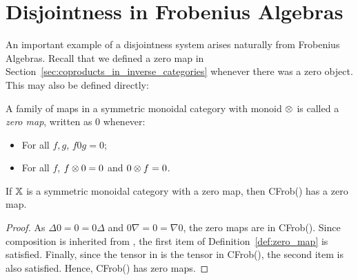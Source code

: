 \section{Disjointness in Frobenius Algebras}
\label{sec:disjointness_in_frobenius_algebras}
An important example of a disjointness system arises naturally from Frobenius Algebras. Recall that
we defined a zero map in Section~\ref{sec:coproducts_in_inverse_categories} whenever there was a
zero object. This may also be defined directly:

\begin{definition}\label{def:zero_map}
  A family of maps in a symmetric monoidal category with monoid $\otimes$ is called a \emph{zero map},
  written as $0$ whenever:
  \begin{itemize}
    \item For all $f, g$, $f 0 g = 0$;
    \item For all $f$, $f \otimes 0 = 0$ and $ 0 \otimes f = 0$.
  \end{itemize}
\end{definition}

\begin{lemma}\label{lem:cfrobx-has-a-zero-when-x-has-zero}
  If $\mathbb{X}$ is a symmetric monoidal category with a zero map, then CFrob(\X) has a zero map.
\end{lemma}
\begin{proof}
  As $\Delta 0 = 0 = 0 \Delta$ and $0 \nabla = 0 = \nabla 0$, the zero maps are in CFrob(\X). Since
  composition is inherited from \X, the first item of Definition~\ref{def:zero_map} is
  satisfied. Finally, since the tensor in \X is the tensor in CFrob(\X), the second item is also
  satisfied. Hence, CFrob(\X) has zero maps.
\end{proof}

